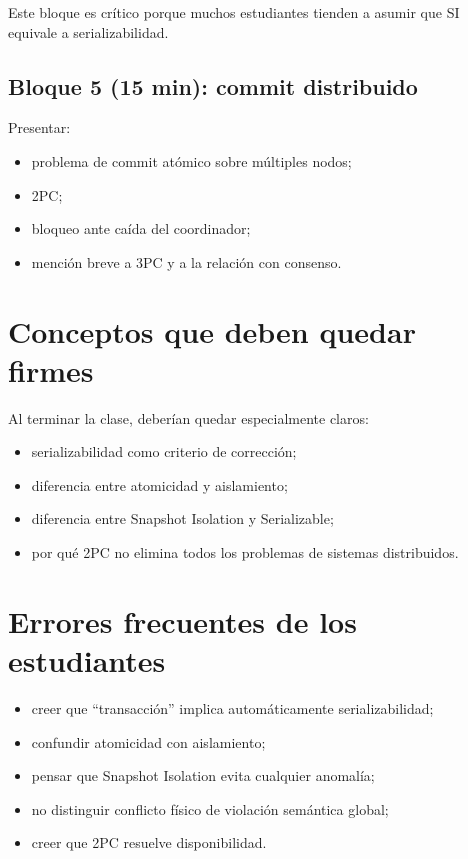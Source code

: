 \documentclass[variant=docente,cover=institutional,mode=screen]{ua-engineering-v6-article}
\begin{document}
Este bloque es crítico porque muchos estudiantes tienden a asumir que SI equivale a serializabilidad.

\subsection*{Bloque 5 (15 min): commit distribuido}

Presentar:

\begin{itemize}
\item problema de commit atómico sobre múltiples nodos;
\item 2PC;
\item bloqueo ante caída del coordinador;
\item mención breve a 3PC y a la relación con consenso.
\end{itemize}

\section{Conceptos que deben quedar firmes}

Al terminar la clase, deberían quedar especialmente claros:

\begin{itemize}
\item serializabilidad como criterio de corrección;
\item diferencia entre atomicidad y aislamiento;
\item diferencia entre Snapshot Isolation y Serializable;
\item por qué 2PC no elimina todos los problemas de sistemas distribuidos.
\end{itemize}

\section{Errores frecuentes de los estudiantes}

\begin{itemize}
\item creer que “transacción” implica automáticamente serializabilidad;
\item confundir atomicidad con aislamiento;
\item pensar que Snapshot Isolation evita cualquier anomalía;
\item no distinguir conflicto físico de violación semántica global;
\item creer que 2PC resuelve disponibilidad.
\end{itemize}
\end{document}
